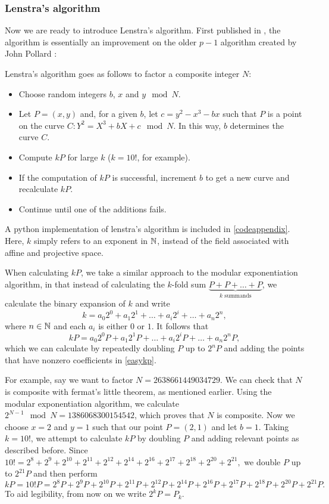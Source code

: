 \subsubsection{Lenstra's algorithm}
Now we are ready to introduce Lenstra's algorithm.
First published in \cite{lenstra1987}, the algorithm is essentially an improvement on the older $p-1$ algorithm created by John Pollard \cite{tate2013,pollard1974}:
\begin{definition}
	Lenstra's algorithm goes as follows to factor a composite integer $N$:
	\begin{itemize}
		\item Choose random integers $b$, $x$ and $y \mod N$.
		\item Let $P = (x,y)$ and, for a given $b$, let $c = y^2 - x^3 - bx$ such that $P$ is a point on the curve $C: Y^2 = X^3 +bX + c \mod N$.
			In this way, $b$ determines the curve $C$.
		\item Compute $kP$ for large $k$ ($k=10!$, for example).
		\item If the computation of $kP$ is successful, increment $b$ to get a new curve and recalculate $kP$.
		\item Continue until one of the additions fails.
	\end{itemize}
\end{definition}
A python implementation of lenstra's algorithm is included in \cref{codeappendix}.
Here, $k$ simply refers to an exponent in $\mathbb{N}$, instead of the field associated with affine and projective space.

When calculating $kP$, we take a similar approach to the modular exponentiation algorithm, in that instead of calculating the $k$-fold sum $\underbrace{P+P+\ldots+P}_{k\text{ summands}}$, we calculate the binary expansion of $k$ and write
$$k = a_0 2^0 + a_1 2^1 + \ldots + a_i 2^i + \ldots + a_n 2^n,$$
where $n\in\mathbb{N}$ and each $a_i$ is either $0$ or $1$.
It follows that
\begin{equation}
kP = a_0 2^0 P + a_1 2^1 P + \ldots + a_i 2^i P + \ldots + a_n 2^n P,
\label{easykp}
\end{equation}
which we can calculate by repeatedly doubling $P$ up to $2^n P$ and adding the points that have nonzero coefficients in \cref{easykp}.

For example, say we want to factor $N = 2638661449034729$.
We can check that $N$ is composite with fermat's little theorem, as mentioned earlier.
Using the modular exponentiation algorithm, we calculate $2^{N-1} \mod N = 1386068300154542$, which proves that $N$ is composite.
Now we choose $x=2$ and $y=1$ such that our point $P = (2,1)$ and let $b = 1$.
Taking $k=10!$, we attempt to calculate $kP$ by doubling $P$ and adding relevant points as described before.
Since $10! = 2^{8} + 2^{9} + 2^{10} + 2^{11} + 2^{12} + 2^{14} + 2^{16} + 2^{17} + 2^{18} + 2^{20} + 2^{21},$ we double $P$ up to $2^{21}P$ and then perform
$$kP = 10!P = 2^{8}P + 2^{9}P + 2^{10}P + 2^{11}P + 2^{12}P + 2^{14}P + 2^{16}P + 2^{17}P + 2^{18}P + 2^{20}P + 2^{21}P.$$
To aid legibility, from now on we write $2^k P = P_k$.

